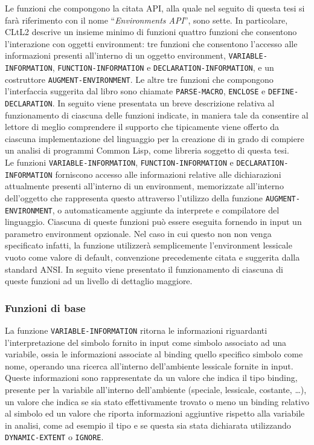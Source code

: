 Le funzioni che compongono la citata API, alla quale nel seguito di questa tesi
si farà riferimento con il nome \enquote{\textit{Environments API}}, sono sette.
In particolare, CLtL2 descrive un insieme minimo di funzioni quattro funzioni
che consentono l’interazione con oggetti environment: tre funzioni che
consentono l’accesso alle informazioni presenti all’interno di un oggetto
environment, \texttt {VARIABLE-INFORMATION}, \texttt{FUNCTION-INFORMATION} e
\texttt {DECLARATION-INFORMATION}, e un costruttore \texttt
{AUGMENT-ENVIRONMENT}. Le altre tre funzioni che compongono l’interfaccia
suggerita dal libro sono chiamate \texttt {PARSE-MACRO}, \texttt{ENCLOSE} e
\texttt{DEFINE- DECLARATION}. In seguito viene presentata un breve descrizione
relativa al funzionamento di ciascuna delle funzioni indicate, in maniera tale
da consentire al lettore di meglio comprendere il supporto che tipicamente viene
offerto da ciascuna implementazione del linguaggio per la creazione di in grado
di compiere un analisi di programmi Common Lisp, come libreria soggetto di
questa tesi.\\

Le funzioni \texttt{VARIABLE-INFORMATION}, \texttt{FUNCTION-INFORMATION} e
\texttt{DECLARATION-INFORMATION} forniscono accesso alle informazioni relative
alle dichiarazioni attualmente presenti all’interno di un environment,
memorizzate all’interno dell’oggetto che rappresenta questo attraverso
l’utilizzo della funzione \texttt{AUGMENT-ENVIRONMENT}, o automaticamente
aggiunte da interprete e compilatore del linguaggio. Ciascuna di queste funzioni
può essere eseguita fornendo in input un parametro environment opzionale. Nel
caso in cui questo non non venga specificato infatti, la funzione utilizzerà
semplicemente l’environment lessicale vuoto come valore di default, convenzione
precedemente citata e suggerita dalla standard ANSI. In seguito viene presentato
il funzionamento di ciascuna di queste funzioni ad un livello di dettaglio
maggiore.

\subsubsection{Funzioni di base}

La funzione \texttt{VARIABLE-INFORMATION} ritorna le informazioni riguardanti
l’interpretazione del simbolo fornito in input come simbolo associato ad una
variabile, ossia le informazioni associate al binding quello specifico simbolo
come nome, operando una ricerca all’interno dell'ambiente lessicale fornite in
input. Queste informazioni sono rappresentate da un valore che indica il tipo
binding, presente per la variabile all’interno dell’ambiente (speciale,
lessicale, costante, \dots), un valore che indica se sia stato effettivamente
trovato o meno un binding relativo al simbolo ed un valore che riporta
informazioni aggiuntive rispetto alla variabile in analisi, come ad esempio il
tipo e se questa sia stata dichiarata utilizzando \texttt {DYNAMIC-EXTENT} o
\texttt{IGNORE}.\\

